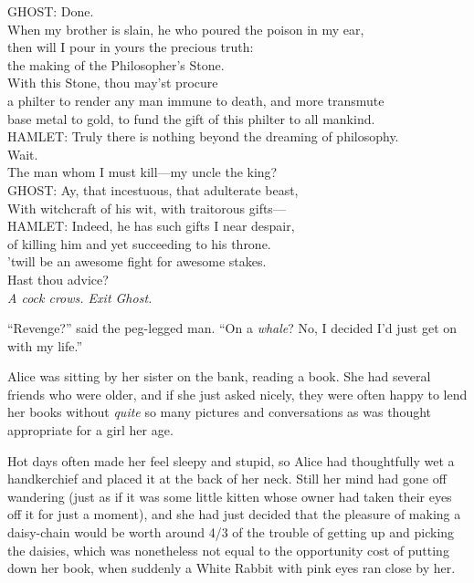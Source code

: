 \begin{playdialog}
GHOST: Done.\\
When my brother is slain, he who poured the poison in my ear,\\
then will I pour in yours the precious truth:\\
the making of the Philosopher’s Stone.\\
With this Stone, thou may’st procure\\
a philter to render any man immune to death, and more transmute\\
base metal to gold, to fund the gift of this philter to all mankind.\\

HAMLET: Truly there is nothing beyond the dreaming of philosophy.\\
Wait.\\
The man whom I must kill—my uncle the king?\\

GHOST: Ay, that incestuous, that adulterate beast,\\
With witchcraft of his wit, with traitorous gifts—\\

HAMLET: Indeed, he has such gifts I near despair,\\
of killing him and yet succeeding to his throne.\\
’twill be an awesome fight for awesome stakes.\\
Hast thou advice?\\

\emph{A cock crows. Exit Ghost.}
\end{playdialog}


“Revenge?” said the peg-legged man. “On a \emph{whale}? No, I decided I’d just get on with my life.”


Alice was sitting by her sister on the bank, reading a book. She had several friends who were older, and if she just asked nicely, they were often happy to lend her books without \emph{quite} so many pictures and conversations as was thought appropriate for a girl her age.

Hot days often made her feel sleepy and stupid, so Alice had thoughtfully wet a handkerchief and placed it at the back of her neck. Still her mind had gone off wandering (just as if it was some little kitten whose owner had taken their eyes off it for just a moment), and she had just decided that the pleasure of making a daisy-chain would be worth around 4/3 of the trouble of getting up and picking the daisies, which was nonetheless not equal to the opportunity cost of putting down her book, when suddenly a White Rabbit with pink eyes ran close by her.

